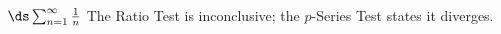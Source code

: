 {$\ds\sum_{n=1}^\infty \frac{1}{n}$
}
{The Ratio Test is inconclusive; the $p$-Series Test states it diverges.
}